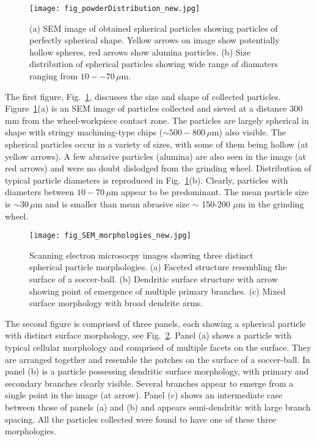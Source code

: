 \documentclass[11pt]{article}
\begin{document}
\begin{figure}
  \centering
  \texttt{[image: fig\_powderDistribution\_new.jpg]}
  \caption{(a) SEM image of obtained spherical particles showing particles of perfectly spherical shape. Yellow arrows on image show potentially hollow spheres, red arrows show alumina particles. (b) Size distribution of spherical particles showing wide range of diamaters ranging from $10--70\,\mu$m.}
  \label{fig:SEM_images}
\end{figure}

The first figure, Fig.~\ref{fig:SEM_images}, discusses the size and shape of collected particles. Figure~\ref{fig:SEM_images}(a) is an SEM image of particles collected and sieved at a distance 300 mm from the wheel-workpiece contact zone. The particles are largely spherical in shape with stringy machining-type chips ($\sim 500-800\,\mu$m) also visible. The spherical particles occur in a variety of sizes, with some of them being hollow (at yellow arrows). A few abrasive particles (alumina) are also seen in the image (at red arrows) and were no doubt dislodged from the grinding wheel. Distribution of typical particle diameters is reproduced in Fig.~\ref{fig:SEM_images}(b). Clearly, particles with diameters between $10-70\,\mu$m appear to be predominant. The mean particle size is $\sim 30\,\mu$m and is smaller than mean abrasive size $\sim$ 150-200 $\mu$m in the grinding wheel.


\begin{figure}
  \centering
  \texttt{[image: fig\_SEM\_morphologies\_new.jpg]}
  \caption{Scanning electron microsocpy images showing three distinct spherical particle morphologies. (a) Faceted structure resembling the surface of a soccer-ball. (b) Dendritic surface structure with arrow showing point of emergence of multiple primary branches. (c) Mixed surface morphology with broad dendrite arms.}
  \label{fig:SEM_morphologies}
\end{figure}

The second figure is comprised of three panels, each showing a spherical particle with distinct surface morphology, see Fig.~\ref{fig:SEM_morphologies}. Panel (a) shows a particle with typical cellular morphology and comprised of multiple facets on the surface. They are arranged together and resemble the patches on the surface of a soccer-ball. In panel (b) is a particle possessing dendritic surface morphology, with primary and secondary branches clearly visible. Several branches appear to emerge from a single point in the image (at arrow). Panel (c) shows an intermediate case between those of panels (a) and (b) and appears semi-dendritic with large branch spacing. All the particles collected were found to have one of these three morphologies. 
\end{document}
